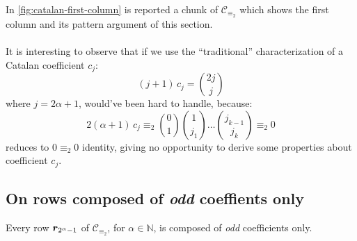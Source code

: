 In \autoref{fig:catalan-first-column} is reported a chunk of $\mathcal{C}_{\equiv_{2}}$
which shows the first column and its pattern argument of this section.
\\\\
It is interesting to observe that if we use the ``traditional'' characterization
of a Catalan coefficient $c_{j}$:
\begin{displaymath}
    (j+1)\,c_{j} = {{2j}\choose{j}} 
\end{displaymath}
where $j=2\alpha+1$, would've been hard to handle, because:
\begin{displaymath}
    2(\alpha+1)\,c_{j}\equiv_{2} {{0}\choose{1}}{{1}\choose{j_{1}}}
            \ldots{{j_{k-1}}\choose{j_{k}}} \equiv_{2} 0
\end{displaymath}
reduces to $0\equiv_{2}0$ identity, giving no opportunity to derive some
properties about coefficient $c_{j}$.



\subsection{On rows composed of \emph{odd} coeffients only}

\begin{theorem}
    Every row $\boldsymbol{r}_{2^{\alpha}-1}$ of $\mathcal{C}_{\equiv_{2}}$, 
    for $\alpha\in\mathbb{N}$, is composed of \emph{odd} coefficients only.
\end{theorem}

